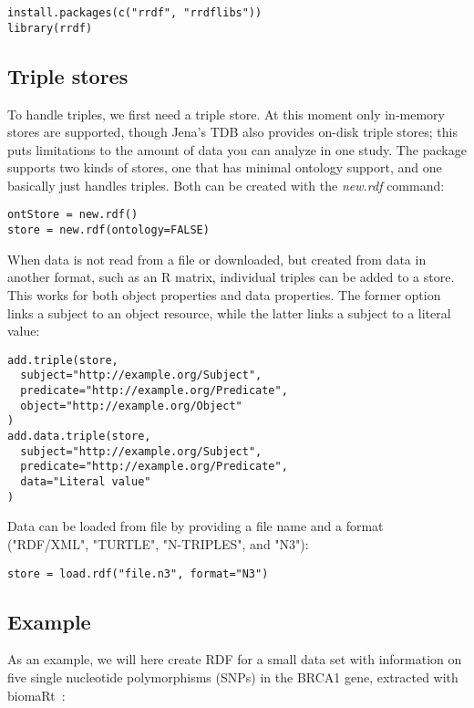 \documentclass[12pt]{article}
\begin{document}
\begin{verbatim}
install.packages(c("rrdf", "rrdflibs"))
library(rrdf)
\end{verbatim}

\subsection{Triple stores}

To handle triples, we first need a triple store. At this moment only in-memory stores are
supported, though Jena's TDB also provides on-disk triple stores; this puts limitations to
the amount of data you can analyze in one study.
The package supports two kinds of stores, one that has minimal ontology support, and one
basically just handles triples. Both can be created with the \textit{new.rdf} command:

\begin{verbatim}
ontStore = new.rdf()
store = new.rdf(ontology=FALSE)
\end{verbatim}

When data is not read from a file or downloaded, but created from data in another format,
such as an R matrix, individual triples can be added to a store. This works for both
object properties and data properties. The former option links a subject to an object
resource, while the latter links a subject to a literal value:

\begin{verbatim}
add.triple(store,
  subject="http://example.org/Subject",
  predicate="http://example.org/Predicate",
  object="http://example.org/Object"
)
add.data.triple(store,
  subject="http://example.org/Subject",
  predicate="http://example.org/Predicate",
  data="Literal value"
)
\end{verbatim}

Data can be loaded from file by providing a file name and a format ("RDF/XML", "TURTLE",
"N-TRIPLES", and "N3"):

\begin{verbatim}
store = load.rdf("file.n3", format="N3")
\end{verbatim}

\subsection{Example}

As an example, we will here create RDF for a small data set with information on five single nucleotide
polymorphisms (SNPs) in the BRCA1 gene, extracted with biomaRt~\cite{Durinck2005}:
\end{document}
